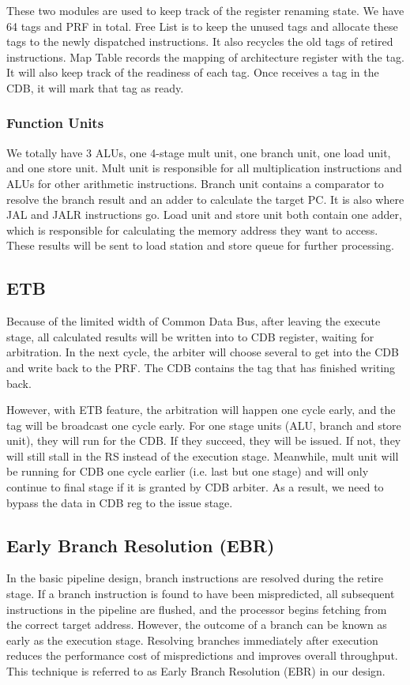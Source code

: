 These two modules are used to keep track of the register renaming state. We have 64 tags and PRF in total. Free List is to keep the unused tags and allocate these tags to the newly dispatched instructions. It also recycles the old tags of retired instructions. Map Table records the mapping of architecture register with the tag. It will also keep track of the readiness of each tag. Once receives a tag in the CDB, it will mark that tag as ready. 

\subsubsection{Function Units}

We totally have 3 ALUs, one 4-stage mult unit, one branch unit, one load unit, and one store unit. Mult unit is responsible for all multiplication instructions and ALUs for other arithmetic instructions. Branch unit contains a comparator to resolve the branch result and an adder to calculate the target PC. It is also where JAL and JALR instructions go. Load unit and store unit both contain one adder, which is responsible for calculating the memory address they want to access. These results will be sent to load station and store queue for further processing. 


\subsection{ETB}
Because of the limited width of Common Data Bus, after leaving the execute stage, all calculated results will be written into to CDB register, waiting for arbitration. In the next cycle, the arbiter will choose several to get into the CDB and write back to the PRF. The CDB contains the tag that has finished writing back. 

However, with ETB feature, the arbitration will happen one cycle early, and the tag will be broadcast one cycle early. For one stage units (ALU, branch and store unit), they will run for the CDB. If they succeed, they will be issued. If not, they will still stall in the RS instead of the execution stage. Meanwhile, mult unit will be running for CDB one cycle earlier (i.e. last but one stage) and will only continue to final stage if it is granted by CDB arbiter. As a result, we need to bypass the data in CDB reg to the issue stage. 

\subsection{Early Branch Resolution (EBR)}
In the basic pipeline design, branch instructions are resolved during the retire stage. If a branch instruction is found to have been mispredicted, all subsequent instructions in the pipeline are flushed, and the processor begins fetching from the correct target address. However, the outcome of a branch can be known as early as the execution stage. Resolving branches immediately after execution reduces the performance cost of mispredictions and improves overall throughput. This technique is referred to as Early Branch Resolution (EBR) in our design.

